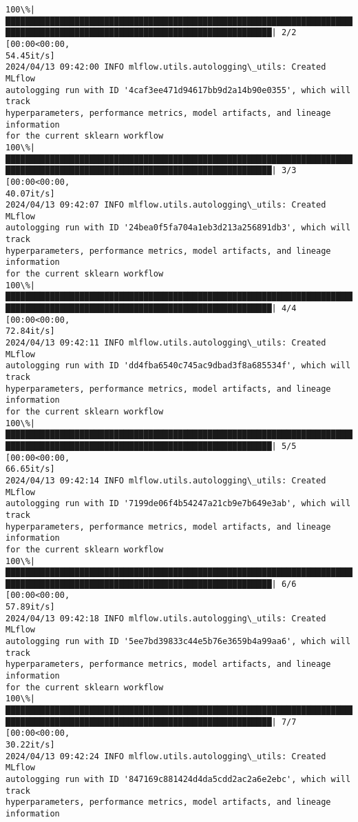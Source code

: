 \documentclass[11pt]{article}
\begin{document}
    \begin{Verbatim}[commandchars=\\\{\}]
100\%|███████████████████████████████████████████████████████████████████████████
██████████████████████████████████████████████████████| 2/2 [00:00<00:00,
54.45it/s]
2024/04/13 09:42:00 INFO mlflow.utils.autologging\_utils: Created MLflow
autologging run with ID '4caf3ee471d94617bb9d2a14b90e0355', which will track
hyperparameters, performance metrics, model artifacts, and lineage information
for the current sklearn workflow
100\%|███████████████████████████████████████████████████████████████████████████
██████████████████████████████████████████████████████| 3/3 [00:00<00:00,
40.07it/s]
2024/04/13 09:42:07 INFO mlflow.utils.autologging\_utils: Created MLflow
autologging run with ID '24bea0f5fa704a1eb3d213a256891db3', which will track
hyperparameters, performance metrics, model artifacts, and lineage information
for the current sklearn workflow
100\%|███████████████████████████████████████████████████████████████████████████
██████████████████████████████████████████████████████| 4/4 [00:00<00:00,
72.84it/s]
2024/04/13 09:42:11 INFO mlflow.utils.autologging\_utils: Created MLflow
autologging run with ID 'dd4fba6540c745ac9dbad3f8a685534f', which will track
hyperparameters, performance metrics, model artifacts, and lineage information
for the current sklearn workflow
100\%|███████████████████████████████████████████████████████████████████████████
██████████████████████████████████████████████████████| 5/5 [00:00<00:00,
66.65it/s]
2024/04/13 09:42:14 INFO mlflow.utils.autologging\_utils: Created MLflow
autologging run with ID '7199de06f4b54247a21cb9e7b649e3ab', which will track
hyperparameters, performance metrics, model artifacts, and lineage information
for the current sklearn workflow
100\%|███████████████████████████████████████████████████████████████████████████
██████████████████████████████████████████████████████| 6/6 [00:00<00:00,
57.89it/s]
2024/04/13 09:42:18 INFO mlflow.utils.autologging\_utils: Created MLflow
autologging run with ID '5ee7bd39833c44e5b76e3659b4a99aa6', which will track
hyperparameters, performance metrics, model artifacts, and lineage information
for the current sklearn workflow
100\%|███████████████████████████████████████████████████████████████████████████
██████████████████████████████████████████████████████| 7/7 [00:00<00:00,
30.22it/s]
2024/04/13 09:42:24 INFO mlflow.utils.autologging\_utils: Created MLflow
autologging run with ID '847169c881424d4da5cdd2ac2a6e2ebc', which will track
hyperparameters, performance metrics, model artifacts, and lineage information

\end{Verbatim}
\end{document}
